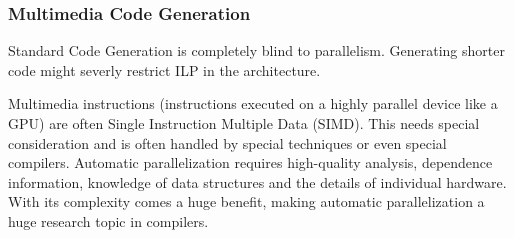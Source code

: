 \documentclass{article}
\begin{document}
\subsubsection{Multimedia Code Generation}
Standard Code Generation is completely blind to parallelism.
Generating shorter code might severly restrict ILP in the architecture.

Multimedia instructions (instructions executed on a highly parallel device like a GPU) are often Single Instruction Multiple Data (SIMD).
This needs special consideration and is often handled by special techniques or even special compilers.
Automatic parallelization requires high-quality analysis, dependence information, knowledge of data structures and the details of individual hardware.
With its complexity comes a huge benefit, making automatic parallelization a huge research topic in compilers.
\end{document}
